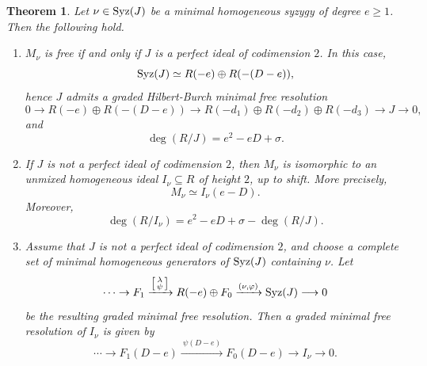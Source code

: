 \documentclass[11pt]{amsart} %
\newcommand{\lar}{\longrightarrow}
\newtheorem{Theorem}{Theorem}[section]
\theoremstyle{definition}
\def\syz{\mbox{\rm Syz}}
\begin{document}
\begin{Theorem}\label{Bour3Gens}
Let $\nu\in \syz(J)$ be a minimal homogeneous syzygy of degree $e\geq 1$. Then the following hold.
\begin{enumerate}
\item[\rm(a)]
$M_\nu$ is free if and only if $J$ is a perfect ideal of codimension $2$. In this case,
\[
\syz(J)\simeq R(-e)\oplus R(-(D-e)),
\]
hence $J$ admits a graded Hilbert-Burch minimal free resolution
\[
0\lar R(-e)\oplus R(-(D-e))
\lar
R(-d_1)\oplus R(-d_2)\oplus R(-d_3)
\lar J\lar 0,
\]
and
\[
\deg(R/J)=e^2-eD+\sigma.
\]

\item[\rm(b)]
If $J$ is not a perfect ideal of codimension $2$, then $M_\nu$ is isomorphic to an unmixed homogeneous ideal $I_\nu\subseteq R$ of height $2$, up to shift. More precisely,
\[
M_\nu \simeq I_\nu(e-D).
\]
Moreover,
\[
\deg(R/I_\nu)=e^2-eD+\sigma-\deg(R/J).
\]

\item[\rm(c)]
Assume that $J$ is not a perfect ideal of codimension $2$, and choose a complete set of minimal homogeneous
generators of $\syz(J)$ containing $\nu$. Let
\[
\cdots \to F_1
\xrightarrow{\left[\begin{smallmatrix}\lambda\\ \psi\end{smallmatrix}\right]}
R(-e)\oplus F_0
\xrightarrow{(\nu,\varphi)}
\syz(J)
\lar 0
\]
be the resulting graded minimal free resolution. Then a graded minimal free
resolution of $I_\nu$ is given by
\[
\cdots \to F_1(D-e)
\xrightarrow{\ \psi(D-e)\ }
F_0(D-e)
\lar I_\nu
\lar 0.
\]
\end{enumerate}
\end{Theorem}
\end{document}
